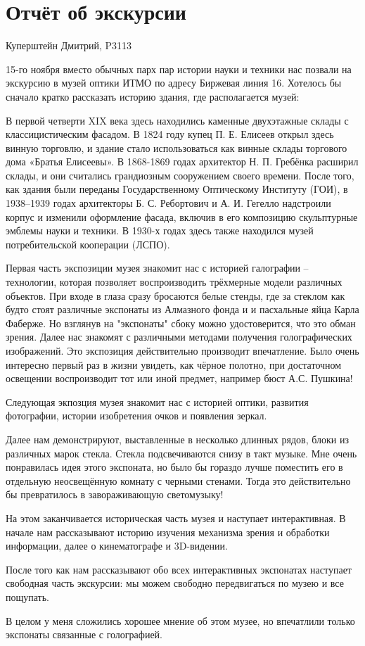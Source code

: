\documentclass[11pt]{article}
\begin{document}
\section*{Отчёт об экскурсии}
\begin{flushright}
Куперштейн Дмитрий, P3113
\end{flushright}

15-го ноября вместо обычных парх пар истории науки и техники нас позвали на экскурсию в музей оптики ИТМО по адресу Биржевая линия 16. Хотелось бы сначало кратко рассказать историю здания, где располагается музей:

 В первой четверти XIX века здесь находились каменные двухэтажные склады с классицистическим фасадом. В 1824 году купец П. Е. Елисеев открыл здесь винную торговлю, и здание стало использоваться как винные склады торгового дома «Братья Елисеевы». В 1868-1869 годах архитектор Н. П. Гребёнка расширил склады, и они считались грандиозным сооружением своего времени. После того, как здания были переданы Государственному Оптическому Институту (ГОИ), в 1938--1939 годах архитекторы Б. С. Ребортович и А. И. Гегелло надстроили корпус и изменили оформление фасада, включив в его композицию скульптурные эмблемы науки и техники. В 1930-х годах здесь также находился музей потребительской кооперации (ЛСПО).

Первая часть экспозиции музея знакомит нас с историей галографии -- технологии, которая позволяет воспроизводить трёхмерные модели различных объектов. При входе в глаза сразу бросаются белые стенды, где за стеклом как будто стоят различные экспонаты из Алмазного фонда и и пасхальные яйца Карла Фаберже. Но взглянув на "экспонаты" сбоку можно удостоверится, что это обман зрения. Далее нас знакомят с различными методами получения голографических изображений.
Это экспозиция действительно производит впечатление. Было очень интересно первый раз в жизни увидеть, как чёрное полотно, при достаточном освещении воспроизводит тот или иной предмет, например бюст А.С. Пушкина!

Следующая экпозция музея знакомит нас с историей оптики, развития фотографии, истории изобретения очков и появления зеркал.

Далее нам демонстрируют, выставленные в несколько длинных рядов, блоки из различных марок стекла. Стекла подсвечиваются снизу в такт музыке. Мне очень понравилась идея этого экспоната, но было бы гораздо лучше поместить его в отдельную неосвещённую комнату с черными стенами. Тогда это действительно бы превратилось в завораживающую светомузыку!

На этом заканчивается историческая часть музея и наступает интерактивная. В начале нам рассказывают историю изучения механизма зрения и обработки информации, далее о кинематографе и 3D-видении.

После того как нам рассказывают обо всех интерактивных экспонатах наступает свободная часть экскурсии: мы можем свободно передвигаться по музею и все пощупать.

В целом у меня сложились хорошее мнение об этом музее, но впечатлили только экспонаты связанные с голографией.
\end{document}
